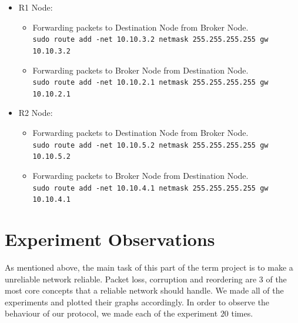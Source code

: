 \documentclass[conference]{IEEEtran}
\begin{document}
\begin{itemize}
    \item R1 Node: 
        \begin{itemize}
            \item Forwarding packets to Destination Node from Broker Node. \\
            \texttt{sudo route add -net 10.10.3.2 netmask 255.255.255.255 gw 10.10.3.2}
            \item Forwarding packets to Broker Node from Destination Node. \\
            \texttt{sudo route add -net 10.10.2.1 netmask 255.255.255.255 gw 10.10.2.1}
        \end{itemize}
    \item R2 Node: 
        \begin{itemize}
            \item Forwarding packets to Destination Node from Broker Node. \\
            \texttt{sudo route add -net 10.10.5.2 netmask 255.255.255.255 gw 10.10.5.2}
            \item Forwarding packets to Broker Node from Destination Node. \\
            \texttt{sudo route add -net 10.10.4.1 netmask 255.255.255.255 gw 10.10.4.1}
        \end{itemize}
\end{itemize}

\section{Experiment Observations}
As mentioned above, the main task of this part of the term project is to make a unreliable network reliable. Packet loss, corruption and reordering are 3 of the most core concepts that a reliable network should handle. We made all of the experiments and plotted their graphs accordingly. In order to observe the behaviour of our protocol, we made each of the experiment $20$ times.
\end{document}
